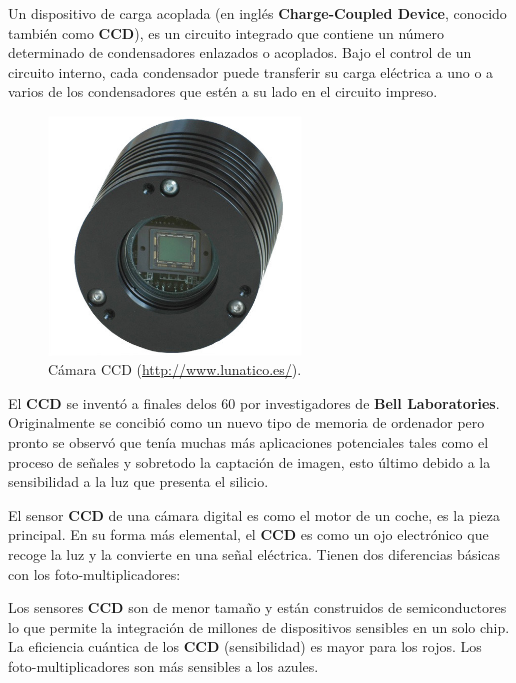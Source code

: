 Un dispositivo de carga acoplada (en inglés \textbf{Charge-Coupled Device}, conocido también como \textbf{CCD}), es un circuito integrado que contiene un número determinado de condensadores enlazados o acoplados. Bajo el control de un circuito interno, cada condensador puede transferir su carga eléctrica a uno o a varios de los condensadores que estén a su lado en el circuito impreso.

\bigskip
\begin{figure}[!ht]
	\begin{center}
		\includegraphics[width=0.6\textwidth]{../images/ccd.jpg}
		\caption[Cámara CCD]{Cámara CCD (\href{http://www.lunatico.es/}{http://www.lunatico.es/}).}
		\label{fig:ccd}
	\end{center}
\end{figure}

\bigskip
El \textbf{CCD} se inventó a finales delos 60 por investigadores de \textbf{Bell Laboratories}. Originalmente se concibió como un nuevo tipo de memoria de ordenador pero pronto se observó que tenía muchas más aplicaciones potenciales tales como el proceso de señales y sobretodo la captación de imagen, esto último debido a la sensibilidad a la luz que presenta el silicio.

\bigskip
El sensor \textbf{CCD} de una cámara digital es como el motor de un coche, es la pieza principal. En su forma más elemental, el \textbf{CCD} es como un ojo electrónico que recoge la luz y la convierte en una señal eléctrica. Tienen dos diferencias básicas con los foto-multiplicadores:

\bigskip
Los sensores \textbf{CCD} son de menor tamaño y están construidos de semiconductores lo que permite la integración de millones de dispositivos sensibles en un solo chip.
La eficiencia cuántica de los \textbf{CCD} (sensibilidad) es mayor para los rojos. Los foto-multiplicadores son más sensibles a los azules.

